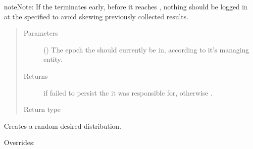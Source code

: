 \documentclass[letterpaper,10pt,english]{sphinxmanual}
\begin{document}
\begin{fulllineitems}
\begin{fulllineitems}
\begin{sphinxadmonition}{note}{Note:}
If the  terminates early, before it reaches
{\hyperref[\detokenize{app.domain:app.domain.master_servers.Master.MAX_EPOCHS}]{}},
nothing should be logged in
{\hyperref[\detokenize{app.domain.helpers:app.domain.helpers.smart_dataclasses.LoggingData}]{}}
at the specified  to avoid skewing previously
collected results.
\end{sphinxadmonition}
\begin{quote}\begin{description}
\item[{Parameters}] \leavevmode
{} () \textendash{} The epoch the  should currently be in, according
to it’s managing  entity.

\item[{Returns}] \leavevmode
{} if  failed to persist the  it
was responsible for, otherwise .

\item[{Return type}] \leavevmode
{}

\end{description}\end{quote}

\end{fulllineitems}


\begin{fulllineitems}
\label{\detokenize{app.domain:app.domain.cluster_groups.SGClusterPerfect.new_desired_distribution}}
Creates a random desired distribution.
\begin{description}
\item[{Overrides:}] \leavevmode
{\hyperref[\detokenize{app.domain:app.domain.cluster_groups.SGCluster.new_desired_distribution}]{}}


\end{description}
\end{fulllineitems}
\end{fulllineitems}
\end{document}

